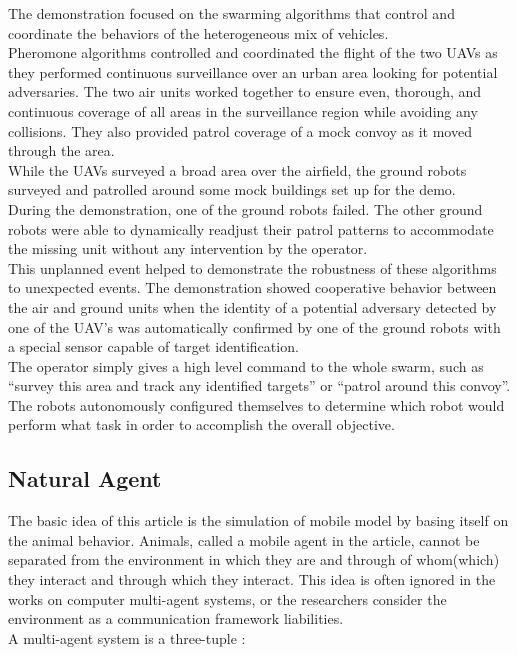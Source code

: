 The demonstration focused on the swarming algorithms that control and coordinate the behaviors of the heterogeneous mix of vehicles.\\
Pheromone  algorithms  controlled  and  coordinated  the  flight  of  the  two  UAVs  as  they performed continuous  surveillance  over  an  urban  area  looking  for  potential  adversaries. The  two  air  units worked together to ensure even, thorough, and continuous coverage of all areas in the surveillance region  while  avoiding  any  collisions. They  also  provided  patrol coverage  of  a  mock  convoy  as  it moved through the area.\\ 
While the UAVs surveyed a broad area over the airfield, the ground robots surveyed and patrolled around  some  mock  buildings  set  up  for  the  demo.\\
During  the  demonstration,  one  of  the  ground robots  failed. The  other  ground  robots were  able  to  dynamically  readjust  their  patrol  patterns to accommodate  the  missing  unit without  any  intervention  by  the  operator.\\
This  unplanned  event helped to demonstrate the robustness of these algorithms to unexpected events. The  demonstration  showed  cooperative  behavior  between  the  air  and  ground  units when  the identity of a potential adversary detected by one of the UAV’s was automatically confirmed by one of the ground robots with a special sensor capable of target identification.\\
The operator simply gives a high level command to the whole swarm, such as “survey this area and track  any  identified  targets”  or  “patrol  around  this  convoy”.\\
The  robots  autonomously  configured themselves to determine which robot would perform what task in order to accomplish the overall objective.

\newpage

\subsection{Natural Agent}

The basic idea of this article is the simulation of mobile model by basing itself on the animal behavior.
Animals, called a mobile agent in the article, cannot be separated from the environment in which they are and through of whom(which) they interact and through which they interact. This idea is often ignored in the works on computer multi-agent systems, or the researchers consider the environment as a communication framework liabilities.\\
A multi-agent system is a three-tuple : 


